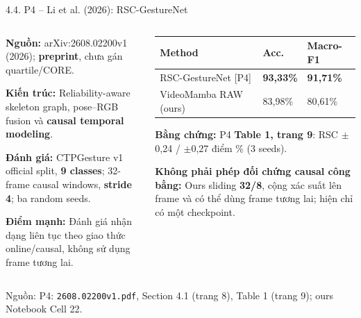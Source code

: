 \documentclass[aspectratio=169,9pt]{beamer}
\newcommand{\smallnote}[1]{{\fontsize{7.1}{8.4}\selectfont #1\par}}
\newcommand{\srcn}[1]{{\fontsize{7.0}{8.2}\selectfont\color{Muted}Nguồn: #1}}
\begin{document}
\begin{frame}{4.4. P4 -- Li et al. (2026): RSC-GestureNet}
\begin{columns}[T,onlytextwidth]
\begin{column}{0.48\textwidth}
\begin{tcolorbox}[titlepanel,title=Phương pháp và protocol,height=5.00cm]
\smallnote{\textbf{Nguồn:} arXiv:2608.02200v1 (2026); \textbf{preprint}, chưa gán quartile/CORE.}\par\vspace{0.14cm}
\smallnote{\textbf{Kiến trúc:} Reliability-aware skeleton graph, pose--RGB fusion và \textbf{causal temporal modeling}.}\par\vspace{0.14cm}
\smallnote{\textbf{Đánh giá:} CTPGesture v1 official split, \textbf{9 classes}; 32-frame causal windows, \textbf{stride 4}; ba random seeds.}\par\vspace{0.14cm}
\smallnote{\textbf{Điểm mạnh:} Đánh giá nhận dạng liên tục theo giao thức online/causal, không sử dụng frame tương lai.}
\end{tcolorbox}
\end{column}
\begin{column}{0.50\textwidth}
\begin{tcolorbox}[titlepanel,title=So sánh continuous cụ thể,height=5.00cm]
\renewcommand{\arraystretch}{1.18}
\begin{tabularx}{\linewidth}{@{}Y C{1.45cm}C{1.35cm}@{}}
\toprule
\textbf{Method} & \textbf{Acc.} & \textbf{Macro-F1}\\\midrule
RSC-GestureNet [P4] & \textbf{93,33\%} & \textbf{91,71\%}\\
VideoMamba RAW (ours) & 83,98\% & 80,61\%\\\bottomrule
\end{tabularx}
\vspace{0.12cm}
\smallnote{\textbf{Bằng chứng:} P4 \textbf{Table 1, trang 9}: RSC $\pm$0,24 / $\pm$0,27 điểm \% (3 seeds).}\par\vspace{0.12cm}
\smallnote{\textbf{Không phải phép đối chứng causal công bằng:} Ours sliding \textbf{32/8}, cộng xác suất lên frame và có thể dùng frame tương lai; hiện chỉ có một checkpoint.}
\end{tcolorbox}
\end{column}
\end{columns}
\vspace{0.06cm}
\srcn{P4: \texttt{2608.02200v1.pdf}, Section 4.1 (trang 8), Table 1 (trang 9); ours Notebook Cell 22.}
\end{frame}
\end{document}
